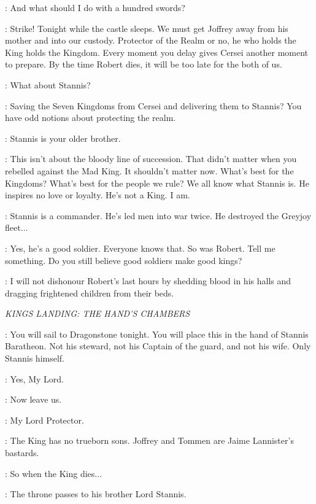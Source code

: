 \NED: And what should I do with a hundred swords? 

\RENLY: Strike! Tonight while the castle sleeps. We must get Joffrey away from his mother and into our custody. Protector of the Realm or no, he who holds the King holds the Kingdom. Every moment you delay gives Cersei another moment to prepare. By the time Robert dies, it will be too late for the both of us. 

\NED: What about Stannis? 

\RENLY: Saving the Seven Kingdoms from Cersei and delivering them to Stannis? You have odd notions about protecting the realm. 

\NED: Stannis is your older brother. 

\RENLY: This isn't about the bloody line of succession. That didn't matter when you rebelled against the Mad King. It shouldn't matter now. What's best for the Kingdoms? What's best for the people we rule? We all know what Stannis is. He inspires no love or loyalty. He's not a King. I am. 

\NED: Stannis is a commander. He's led men into war twice. He destroyed the Greyjoy fleet$\ldots$ 

\RENLY: Yes, he's a good soldier. Everyone knows that. So was Robert. Tell me something. Do you still believe good soldiers make good kings? 

\NED: I will not dishonour Robert's last hours by shedding blood in his halls and dragging frightened children from their beds. 


\scene

\textit{KINGS LANDING: THE HAND'S CHAMBERS} 


\NED: You will sail to Dragonstone tonight. You will place this in the hand of Stannis Baratheon. Not his steward, not his Captain of the guard, and not his wife. Only Stannis himself. 

\BANNERMAN: Yes, My Lord. 


\NED: Now leave us. 

\LITTLEFINGER:  My Lord Protector. 

\NED: The King has no trueborn sons. Joffrey and Tommen are Jaime Lannister's bastards. 

\LITTLEFINGER: So when the King dies$\ldots$ 

\NED: The throne passes to his brother Lord Stannis. 


